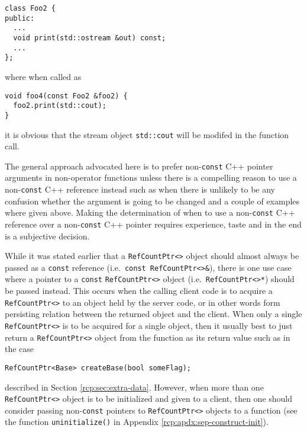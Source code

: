 {\scriptsize\begin{verbatim}
class Foo2 {
public:
  ...
  void print(std::ostream &out) const;
  ...
};
\end{verbatim}}

{}\noindent{}where when called as

{\scriptsize\begin{verbatim}
void foo4(const Foo2 &foo2) {
  foo2.print(std::cout);
}
\end{verbatim}}

{}\noindent{}it is obvious that the stream object {}\texttt{std::cout}
will be modifed in the function call.

The general approach advocated here is to prefer non-\texttt{const}
C++ pointer arguments in non-operator functions unless there is a
compelling reason to use a non-\texttt{const} C++ reference instead
such as when there is unlikely to be any confusion whether the
argument is going to be changed and a couple of examples where given
above.  Making the determination of when to use a non-\texttt{const}
C++ reference over a non-\texttt{const} C++ pointer requires
experience, taste and in the end is a subjective decision.

While it was stated earlier that a {}\texttt{Ref\-Count\-Ptr<>} object
should almost always be passed as a {}\texttt{const} reference
(i.e.~{}\texttt{const Ref\-Count\-Ptr<>\&}), there is one use case
where a pointer to a {}\texttt{const} {}\texttt{Ref\-Count\-Ptr<>}
object (i.e.~{}\texttt{Ref\-Count\-Ptr<>*}) should be passed instead.
This occurs when the calling client code is to acquire a
{}\texttt{Ref\-Count\-Ptr<>} to an object held by the server code, or
in other words form persisting relation between the returned
object and the client.  When only a single
{}\texttt{Ref\-Count\-Ptr<>} is to be acquired for a single object,
then it usually best to just return a {}\texttt{Ref\-Count\-Ptr<>}
object from the function as its return value such as in the case

{\scriptsize\begin{verbatim}
RefCountPtr<Base> createBase(bool someFlag);
\end{verbatim}}

{}\noindent{}described in Section {}\ref{rcp:sec:extra-data}.
However, when more than one {}\texttt{Ref\-Count\-Ptr<>} object is to
be initialized and given to a client, then one should consider passing
non-{}\texttt{const} pointers to {}\texttt{Ref\-Count\-Ptr<>} objects
to a function (see the function {}\texttt{uninitialize()} in Appendix
{}\ref{rcp:apdx:sep-construct-init}).

